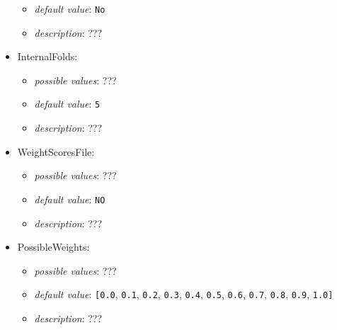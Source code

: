 \documentclass{article}
\begin{document}
\begin{itemize}
\begin{itemize}
                \item \emph{default value}: \texttt{No}
                \item \emph{description}: ???
           \end{itemize}
    \item InternalFolds:
           \begin{itemize}
                \item \emph{possible values}: ???
                \item \emph{default value}: \texttt{5}
                \item \emph{description}: ???
           \end{itemize}
    \item WeightScoresFile:
           \begin{itemize}
                \item \emph{possible values}: ???
                \item \emph{default value}: \texttt{NO}
                \item \emph{description}: ???
           \end{itemize}
    \item PossibleWeights:
           \begin{itemize}
                \item \emph{possible values}: ???
                \item \emph{default value}: \texttt{[0.0}, \texttt{0.1}, \texttt{0.2}, \texttt{0.3}, \texttt{0.4}, \texttt{0.5}, \texttt{0.6}, \texttt{0.7}, \texttt{0.8}, \texttt{0.9}, \texttt{1.0]}
                \item \emph{description}: ???
           \end{itemize}
\end{itemize}
\end{document}
